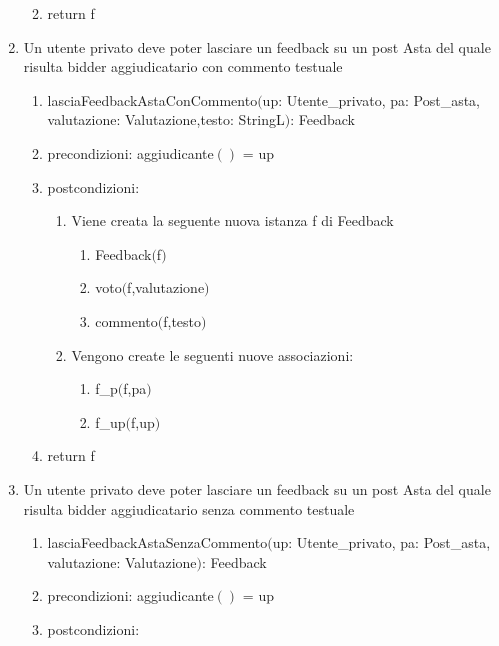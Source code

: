 \documentclass{article}
\begin{document}
\begin{enumerate}
\begin{enumerate}
\begin{enumerate}
\begin{enumerate}
            \end{enumerate}
        \end{enumerate}
        \item return f
    \end{enumerate}
    \item Un utente privato deve poter lasciare un feedback su un post Asta del quale risulta bidder aggiudicatario con commento testuale
    \begin{enumerate}
        \item lasciaFeedbackAstaConCommento$($up: Utente\_privato, pa: Post\_asta, valutazione: Valutazione,\newline testo: StringL$)$: Feedback
        \item precondizioni: aggiudicante$()$ = up
        \item postcondizioni:
        \begin{enumerate}
            \item Viene creata la seguente nuova istanza f di Feedback
            \begin{enumerate}
                \item Feedback$($f$)$
                \item voto$($f,valutazione$)$
                \item commento$($f,testo$)$
            \end{enumerate}
            \item Vengono create le seguenti nuove associazioni:
            \begin{enumerate}
                \item f\_p$($f,pa$)$
                \item f\_up$($f,up$)$
            \end{enumerate}
        \end{enumerate}
        \item return f
    \end{enumerate}
    \item Un utente privato deve poter lasciare un feedback su un post Asta del quale risulta bidder aggiudicatario senza commento testuale
    \begin{enumerate}
        \item lasciaFeedbackAstaSenzaCommento$($up: Utente\_privato, pa: Post\_asta, valutazione: Valutazione$)$: Feedback
        \item precondizioni: aggiudicante$()$ = up
        \item postcondizioni:
        \begin{enumerate}

\end{enumerate}
\end{enumerate}
\end{enumerate}
\end{document}
